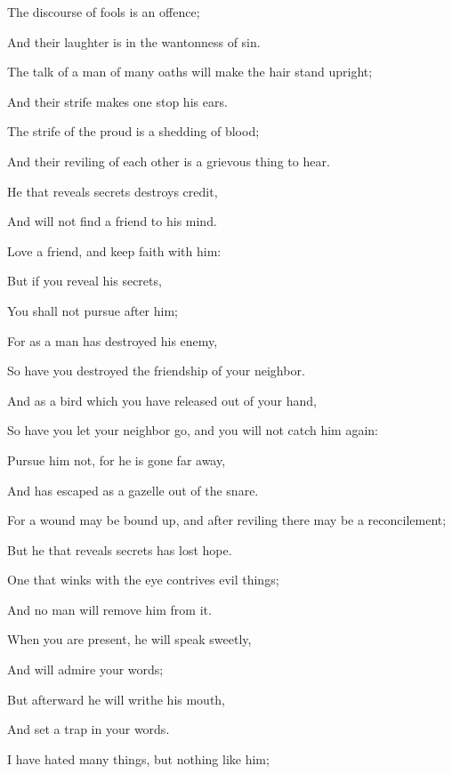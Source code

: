 {\par }{\Q {}The discourse of fools is an offence;
\par }{\Q And their laughter is in the wantonness of sin.
\par }{\Q {}The talk of a man of many oaths will make the hair stand upright;
\par }{\Q And their strife makes one stop his ears.
\par }{\Q {}The strife of the proud is a shedding of blood;
\par }{\Q And their reviling of each other is a grievous thing to hear.
\par }{\BB \par }{\Q {}He that reveals secrets destroys credit,
\par }{\Q And will not find a friend to his mind.
\par }{\Q {}Love a friend, and keep faith with him:
\par }{\Q But if you reveal his secrets,
\par }{\Q You shall not pursue after him;
\par }{\Q {}For as a man has destroyed his enemy,
\par }{\Q So have you destroyed the friendship of your neighbor.
\par }{\Q {}And as a bird which you have released out of your hand,
\par }{\Q So have you let your neighbor go, and you will not catch him again:
\par }{\Q {}Pursue him not, for he is gone far away,
\par }{\Q And has escaped as a gazelle out of the snare.
\par }{\Q {}For a wound may be bound up, and after reviling there may be a reconcilement;
\par }{\Q But he that reveals secrets has lost hope.
\par }{\BB \par }{\Q {}One that winks with the eye contrives evil things;
\par }{\Q And no man will remove him from it.
\par }{\Q {}When you are present, he will speak sweetly,
\par }{\Q And will admire your words;
\par }{\Q But afterward he will writhe his mouth,
\par }{\Q And set a trap
{} in your words.
\par }{\Q {}I have hated many things, but nothing like him;
}
